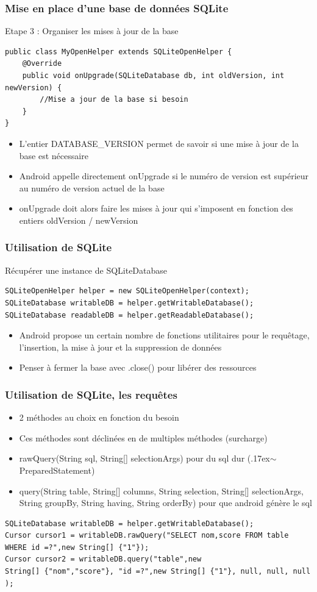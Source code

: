 \documentclass{beamer}
\begin{document}
\begin{frame}[fragile]
\frametitle{Mise en place d'une base de données SQLite}
Etape 3 : Organiser les mises à jour de la base
\begin{lstlisting}
public class MyOpenHelper extends SQLiteOpenHelper {
    @Override
    public void onUpgrade(SQLiteDatabase db, int oldVersion, int newVersion) {
        //Mise a jour de la base si besoin
    }
}
\end{lstlisting}
\begin{itemize}
    \item L'entier DATABASE\_VERSION permet de savoir si une mise à jour de la base est nécessaire
    \item Android appelle directement onUpgrade si le numéro de version est supérieur au numéro de version actuel de la base
    \item onUpgrade doit alors faire les mises à jour qui s'imposent en fonction
    des entiers oldVersion / newVersion
\end{itemize}
\end{frame}
\begin{frame}[fragile]
\frametitle{Utilisation de SQLite}
Récupérer une instance de SQLiteDatabase
\begin{lstlisting}
SQLiteOpenHelper helper = new SQLiteOpenHelper(context);
SQLiteDatabase writableDB = helper.getWritableDatabase();
SQLiteDatabase readableDB = helper.getReadableDatabase();
\end{lstlisting}
\begin{itemize}
    \item Android propose un certain nombre de fonctions utilitaires pour le
    requêtage, l'insertion, la mise à jour et la suppression de données
    \item Penser à fermer la base avec .close() pour libérer des ressources
\end{itemize}
\end{frame}
\begin{frame}[fragile]
\frametitle{Utilisation de SQLite, les requêtes}
\begin{itemize}
    \item 2 méthodes au choix en fonction du besoin
    \item Ces méthodes sont déclinées en de multiples méthodes (surcharge)
    \item rawQuery(String sql, String[] selectionArgs) pour du sql dur ({\raise.17ex\hbox{$\scriptstyle\sim$}} PreparedStatement)
    \item query(String table, String[] columns, String selection, String[] selectionArgs, String groupBy, String having, String orderBy) pour que android génère le sql
\end{itemize}
\begin{lstlisting}
SQLiteDatabase writableDB = helper.getWritableDatabase();
Cursor cursor1 = writableDB.rawQuery("SELECT nom,score FROM table WHERE id =?",new String[] {"1"}); 
Cursor cursor2 = writableDB.query("table",new String[] {"nom","score"}, "id =?",new String[] {"1"}, null, null, null );
\end{lstlisting}
\end{frame}
\end{document}
